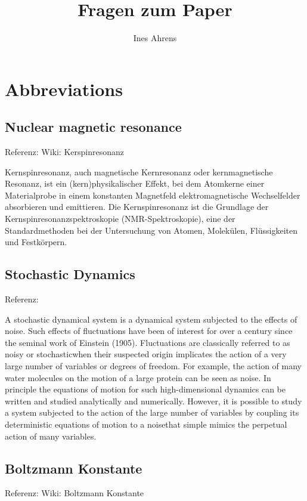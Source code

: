 \documentclass[]{article}
\title{Fragen zum Paper}
\author{Ines Ahrens}
\begin{document}
\maketitle

\tableofcontents

\section{Abbreviations}

\subsection[NMR]{Nuclear magnetic resonance}
Referenz: Wiki: Kerspinresonanz

Kernspinresonanz, auch magnetische Kernresonanz oder kernmagnetische Resonanz, ist ein (kern)physikalischer Effekt, bei dem Atomkerne einer Materialprobe in einem konstanten Magnetfeld elektromagnetische Wechselfelder absorbieren und emittieren. Die Kernspinresonanz ist die Grundlage der Kernspinresonanzspektroskopie (NMR-Spektroskopie), eine der Standardmethoden bei der Untersuchung von Atomen, Molekülen, Flüssigkeiten und Festkörpern. 

\subsection*{Stochastic Dynamics}
Referenz: %

A stochastic dynamical system is a dynamical system subjected to the effects of noise. Such effects of fluctuations have been of interest for over a century since the seminal work of Einstein (1905). Fluctuations are classically referred to as \glqq noisy \grqq or \glqq stochastic\grqq  when their suspected origin implicates the action of a very large number of variables or \glqq degrees of freedom\grqq. For example, the action of many water molecules on the motion of a large protein can be seen as noise. In principle the equations of motion for such high-dimensional dynamics can be written and studied analytically and numerically. However, it is possible to study a system subjected to the action of the large number of variables by coupling its deterministic equations of motion to a \glqq noise\grqq  that simple mimics the perpetual action of many variables. 

\subsection{Boltzmann Konstante}
Referenz: Wiki: Boltzmann Konstante
\end{document}

